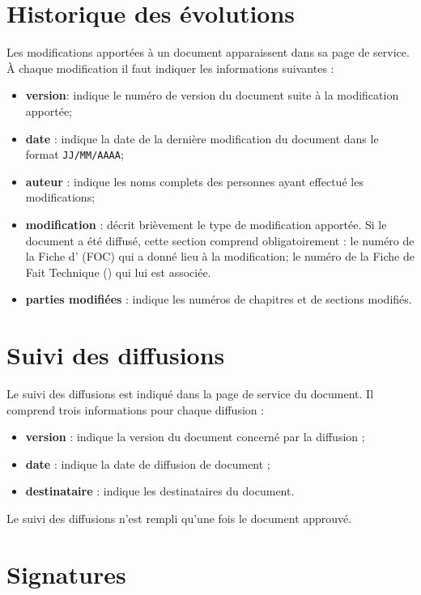 \section{Historique des évolutions}

Les modifications apportées à un document apparaissent dans sa page de service. À chaque modification il faut indiquer les informations suivantes :
\begin{itemize}
 \item \textbf{version}: indique le numéro de version du document suite à la modification apportée;
\item \textbf{date} : indique la date de la dernière modification du document dans le format \verb+JJ/MM/AAAA+;
\item \textbf{auteur} : indique les noms complets des personnes ayant effectué les modifications;
\item \textbf{modification} : décrit brièvement le type de modification apportée. Si le document a
été diffusé, cette section comprend obligatoirement :
	\subitem \textbullet{ }le numéro de la Fiche d'\OC{} (FOC) qui a donné lieu à la modification;
	\subitem \textbullet{ }le numéro de la Fiche de Fait Technique (\FFTCourt{}) qui lui est associée.
\item \textbf{parties modifiées} : indique les numéros de chapitres et de sections modifiés.
\end{itemize}

\section{Suivi des diffusions}

Le suivi des diffusions est indiqué dans la page de service du document. Il comprend trois informations pour chaque diffusion :
\begin{itemize}
\item \textbf{version} : indique la version du document concerné par la diffusion ;
\item  \textbf{date} : indique la date de diffusion de document ;
\item \textbf{destinataire} : indique les destinataires du document. 
\end{itemize}
 Le suivi des diffusions n’est rempli qu’une fois le document approuvé.

\section{Signatures}

